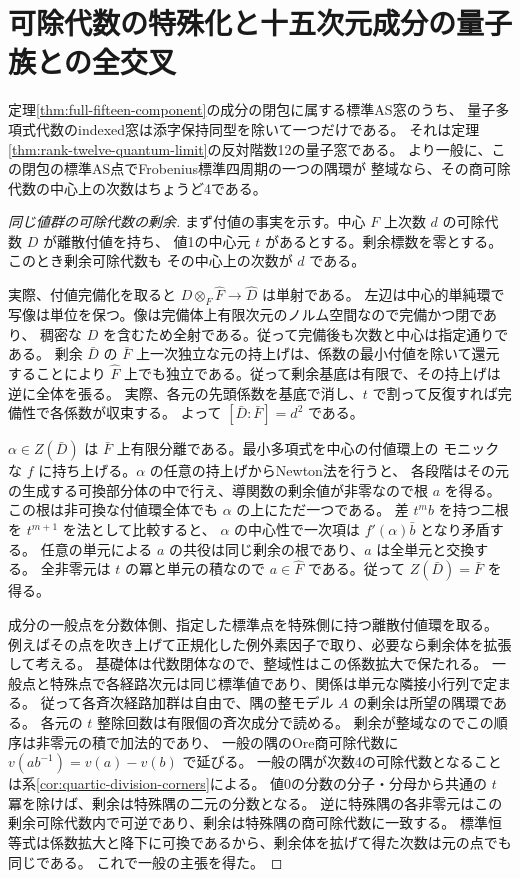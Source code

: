 \section{可除代数の特殊化と十五次元成分の量子族との全交叉}
\label{sec:quantum-component-intersection}
\begin{theorem}\label{thm:quantum-component-intersection}
定理\ref{thm:full-fifteen-component}の成分の閉包に属する標準AS窓のうち、
量子多項式代数のindexed窓は添字保持同型を除いて一つだけである。
それは定理\ref{thm:rank-twelve-quantum-limit}の反対階数12の量子窓である。
より一般に、この閉包の標準AS点でFrobenius標準四周期の一つの隅環が
整域なら、その商可除代数の中心上の次数はちょうど4である。
\end{theorem}
\begin{proof}[同じ値群の可除代数の剰余]
まず付値の事実を示す。中心 $F$ 上次数 $d$ の可除代数 $D$ が離散付値を持ち、
値1の中心元 $t$ があるとする。剰余標数を零とする。このとき剰余可除代数も
その中心上の次数が $d$ である。

実際、付値完備化を取ると $D\otimes_F\widehat F\to\widehat D$ は単射である。
左辺は中心的単純環で写像は単位を保つ。像は完備体上有限次元のノルム空間なので完備かつ閉であり、
稠密な $D$ を含むため全射である。従って完備後も次数と中心は指定通りである。
剰余 $\bar D$ の $\bar F$ 上一次独立な元の持上げは、係数の最小付値を除いて還元することにより
$\widehat F$ 上でも独立である。従って剰余基底は有限で、その持上げは逆に全体を張る。
実際、各元の先頭係数を基底で消し、$t$ で割って反復すれば完備性で各係数が収束する。
よって $[\bar D:\bar F]=d^2$ である。

$\alpha\in Z(\bar D)$ は $\bar F$ 上有限分離である。最小多項式を中心の付値環上の
モニックな $f$ に持ち上げる。$\alpha$ の任意の持上げからNewton法を行うと、
各段階はその元の生成する可換部分体の中で行え、導関数の剰余値が非零なので根 $a$ を得る。
この根は非可換な付値環全体でも $\alpha$ の上にただ一つである。
差 $t^m b$ を持つ二根を $t^{m+1}$ を法として比較すると、
$\alpha$ の中心性で一次項は $f'(\alpha)\bar b$ となり矛盾する。
任意の単元による $a$ の共役は同じ剰余の根であり、$a$ は全単元と交換する。
全非零元は $t$ の冪と単元の積なので $a\in\widehat F$ である。従って $Z(\bar D)=\bar F$ を得る。

成分の一般点を分数体側、指定した標準点を特殊側に持つ離散付値環を取る。
例えばその点を吹き上げて正規化した例外素因子で取り、必要なら剰余体を拡張して考える。
基礎体は代数閉体なので、整域性はこの係数拡大で保たれる。
一般点と特殊点で各経路次元は同じ標準値であり、関係は単元な隣接小行列で定まる。
従って各斉次経路加群は自由で、隅の整モデル $A$ の剰余は所望の隅環である。
各元の $t$ 整除回数は有限個の斉次成分で読める。
剰余が整域なのでこの順序は非零元の積で加法的であり、
一般の隅のOre商可除代数に $v(ab^{-1})=v(a)-v(b)$ で延びる。
一般の隅が次数4の可除代数となることは系\ref{cor:quartic-division-corners}による。
値0の分数の分子・分母から共通の $t$ 冪を除けば、剰余は特殊隅の二元の分数となる。
逆に特殊隅の各非零元はこの剰余可除代数内で可逆であり、剰余は特殊隅の商可除代数に一致する。
標準恒等式は係数拡大と降下に可換であるから、剰余体を拡げて得た次数は元の点でも同じである。
これで一般の主張を得た。
\end{proof}

